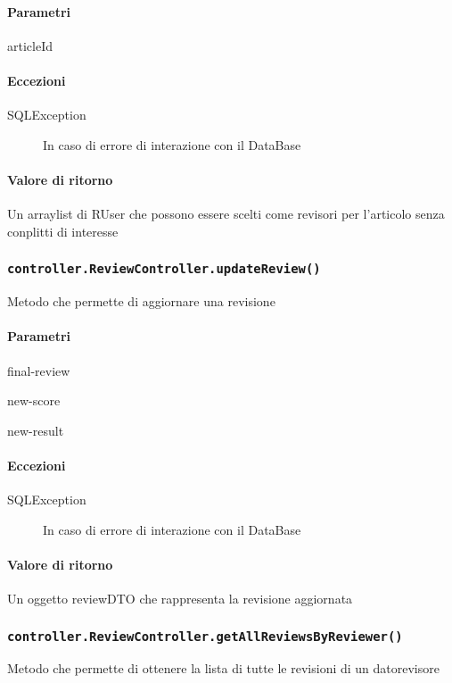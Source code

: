 \paragraph{Parametri}
\begin{description}
\item articleId
\end{description}
\paragraph{Eccezioni}
\begin{description}
\item[SQLException] In caso di errore di interazione con il DataBase
\end{description}
\paragraph{Valore di ritorno}
Un arraylist di RUser che possono essere scelti come revisori per l'articolo senza conplitti di interesse


\subsubsection{\texttt{controller.ReviewController.updateReview()}}
Metodo che permette di aggiornare una revisione
\paragraph{Parametri}
\begin{description}
\item final-review
\item new-score
\item new-result
\end{description}
\paragraph{Eccezioni}
\begin{description}
\item[SQLException] In caso di errore di interazione con il DataBase
\end{description}
\paragraph{Valore di ritorno}
Un oggetto reviewDTO che rappresenta la revisione aggiornata


\subsubsection{\texttt{controller.ReviewController.getAllReviewsByReviewer()}}
Metodo che permette di ottenere la lista di tutte le revisioni di un datorevisore
